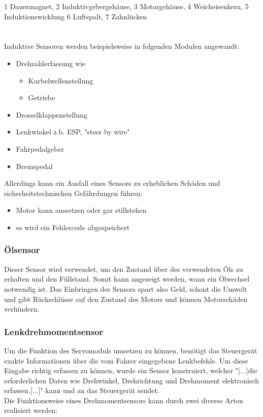 \documentclass{article}
\begin{document}
				\begin{flushleft}
					1 Dauermagnet, 2 Induktivgebergehäuse, 3 Motorgehäuse, 4 Weicheisenkern, 5 Induktionswicklung 6 Luftspalt, 7 Zahnlücken\\
					\\
					\\
					Induktive Sensoren werden beispielsweise in folgenden Modulen angewandt:
					
					\begin{itemize}
						\item Drehzahlerfassung wie
							\begin{itemize}
								\item Kurbelwellenstellung
								\item Getriebe
							\end{itemize}	
						\item Drosselklappenstellung
						\item Lenkwinkel z.b. ESP, "steer by wire"
						\item Fahrpedalgeber
						\item Bremspedal
					\end{itemize}
				
					Allerdings kann ein Ausfall eines Sensors zu erheblichen Schäden und sicherheitstechnischen Gefährdungen führen:
					\begin{itemize}
						\item Motor kann aussetzen oder gar stillstehen
						\item es wird ein Fehlercode abgespeichert
					\end{itemize}	
				\end{flushleft}				
		
			\subsubsection{Ölsensor}
				\begin{flushleft}
					
					Dieser Sensor wird verwendet, um den Zustand über des verwendeten Öls zu erhalten und den Füllstand. Somit kann angezeigt werden, wann ein Ölwechsel notwendig ist. Das Einbringen des Sensors spart also Geld, schont die Umwelt und gibt Rückschlüsse auf den Zustand des Motors und können Motorschäden verhindern.\cite{TS10}

				\end{flushleft}		
		
			\subsubsection{Lenkdrehmomentsensor}
				Um die Funktion des Servomoduls umsetzen zu können, benötigt das Steuergerät exakte Informationen über die vom Fahrer eingegebene Lenkbefehle. Um diese Eingabe richtig erfassen zu können, wurde ein Sensor konstruiert, welcher "[...]die erforderlichen Daten wie Drehwinkel, Drehrichtung und Drehmoment elektronisch erfassen.[...]"\cite{TS11} kann und an das Steuergerät sendet.\\
				Die Funktionsweise eines Drehmomentsensors kann durch zwei diverse Arten realisiert werden:\\
				
\end{document}
